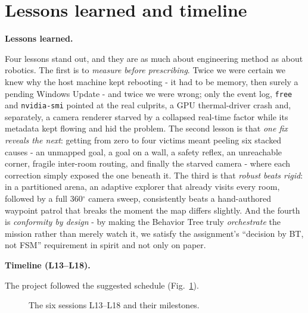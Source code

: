 \documentclass[11pt,a4paper]{article}
\newcommand{\head}[1]{\par\smallskip\noindent\textbf{\color{nccblue}#1}\par}
\begin{document}
\section{Lessons learned and timeline}
\head{Lessons learned.} Four lessons stand out, and they are as much about engineering method as about
robotics. The first is to \emph{measure before prescribing}. Twice we were certain we knew why the host
machine kept rebooting - it had to be memory, then surely a pending Windows Update - and twice we
were wrong; only the event log, \texttt{free} and \texttt{nvidia-smi} pointed at the real culprits, a GPU
thermal-driver crash and, separately, a camera renderer starved by a collapsed real-time factor while
its metadata kept flowing and hid the problem. The second lesson is that \emph{one fix reveals the next}:
getting from zero to four victims meant peeling six stacked causes - an unmapped goal, a goal on a
wall, a safety reflex, an unreachable corner, fragile inter-room routing, and finally the starved camera
- where each correction simply exposed the one beneath it. The third is that \emph{robust beats rigid}:
in a partitioned arena, an adaptive explorer that already visits every room, followed by a full
360$^\circ$ camera sweep, consistently beats a hand-authored waypoint patrol that breaks the moment the
map differs slightly. And the fourth is \emph{conformity by design} - by making the Behavior Tree truly
\emph{orchestrate} the mission rather than merely watch it, we satisfy the assignment's ``decision by BT,
not FSM'' requirement in spirit and not only on paper.

\head{Timeline (L13--L18).} The project followed the suggested schedule (Fig.~\ref{fig:timelineL}).

\begin{figure}[htbp]
\centering
{}
\caption{The six sessions L13--L18 and their milestones.}
\label{fig:timelineL}
\end{figure}
\end{document}
